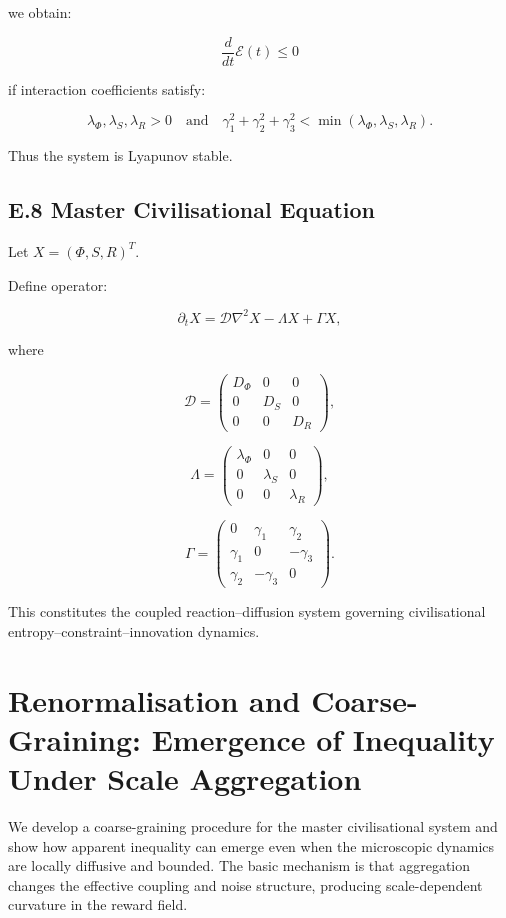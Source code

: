 \documentclass[12pt,a4paper]{article}
\theoremstyle{definition}
\begin{document}
we obtain:

\[
\frac{d}{dt} \mathcal{E}(t) \le 0
\]

if interaction coefficients satisfy:

\[
\lambda_\Phi, \lambda_S, \lambda_R > 0
\quad \text{and}
\quad
\gamma_1^2 + \gamma_2^2 + \gamma_3^2
< \min(\lambda_\Phi,\lambda_S,\lambda_R).
\]

Thus the system is Lyapunov stable.

\subsection*{E.8 Master Civilisational Equation}

Let $X = (\Phi,S,R)^T$.

Define operator:

\[
\partial_t X
=
\mathcal{D} \nabla^2 X
-
\Lambda X
+
\Gamma X,
\]

where

\[
\mathcal{D} =
\begin{pmatrix}
D_\Phi & 0 & 0 \\
0 & D_S & 0 \\
0 & 0 & D_R
\end{pmatrix},
\]

\[
\Lambda =
\begin{pmatrix}
\lambda_\Phi & 0 & 0 \\
0 & \lambda_S & 0 \\
0 & 0 & \lambda_R
\end{pmatrix},
\]

\[
\Gamma =
\begin{pmatrix}
0 & \gamma_1 & \gamma_2 \\
\gamma_1 & 0 & -\gamma_3 \\
\gamma_2 & -\gamma_3 & 0
\end{pmatrix}.
\]

This constitutes the coupled reaction–diffusion system governing civilisational entropy–constraint–innovation dynamics.

\section{Renormalisation and Coarse-Graining: Emergence of Inequality Under Scale Aggregation}
\label{app:renormalisation}

We develop a coarse-graining procedure for the master civilisational system and show how
apparent inequality can emerge even when the microscopic dynamics are locally diffusive and
bounded.  The basic mechanism is that aggregation changes the effective coupling and noise
structure, producing scale-dependent curvature in the reward field.
\end{document}
